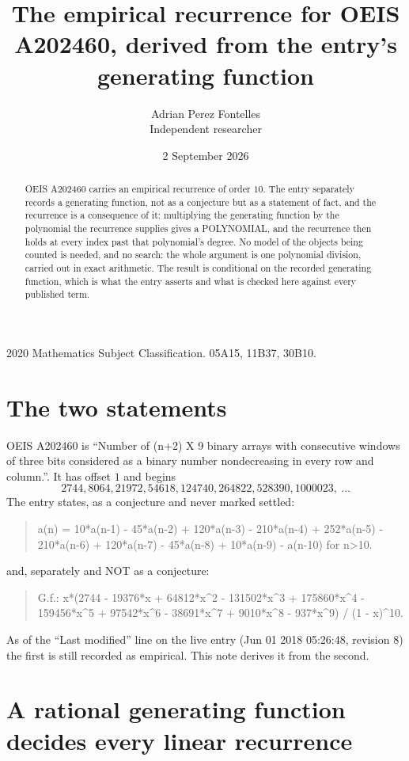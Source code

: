\documentclass[11pt,a4paper]{article}
\title{The empirical recurrence for OEIS A202460, derived from the entry's generating function}
\author{Adrian Perez Fontelles\\ \small Independent researcher}
\date{2 September 2026}
\theoremstyle{plain}
\theoremstyle{definition}
\begin{document}
\maketitle

\begin{abstract}
OEIS A202460 carries an empirical recurrence of order $10$. The entry separately records a
generating function, not as a conjecture but as a statement of fact, and the recurrence is a
consequence of it: multiplying the generating function by the polynomial the recurrence
supplies gives a POLYNOMIAL, and the recurrence then holds at every index past that
polynomial's degree. No model of the objects being counted is needed, and no search: the
whole argument is one polynomial division, carried out in exact arithmetic. The result is
conditional on the recorded generating function, which is what the entry asserts and what is
checked here against every published term.
\end{abstract}

\noindent\small 2020 Mathematics Subject Classification. 05A15, 11B37, 30B10.\normalsize

\section{The two statements}

OEIS A202460 is ``Number of (n+2) X 9 binary arrays with consecutive windows of three bits considered as a binary number nondecreasing in every row and column.''. It has offset $1$ and begins
\[
2744, 8064, 21972, 54618, 124740, 264822, 528390, 1000023,\ \dots
\]
The entry states, as a conjecture and never marked settled:
\begin{quote}
a(n) = 10*a(n-1) - 45*a(n-2) + 120*a(n-3) - 210*a(n-4) + 252*a(n-5) - 210*a(n-6) + 120*a(n-7) - 45*a(n-8) + 10*a(n-9) - a(n-10) for n>10.
\end{quote}
and, separately and NOT as a conjecture:
\begin{quote}
G.f.: x*(2744 - 19376*x + 64812*x\^{}2 - 131502*x\^{}3 + 175860*x\^{}4 - 159456*x\^{}5 + 97542*x\^{}6 - 38691*x\^{}7 + 9010*x\^{}8 - 937*x\^{}9) / (1 - x)\^{}10.
\end{quote}
As of the ``Last modified'' line on the live entry (Jun 01 2018 05:26:48, revision 8) the first is still
recorded as empirical. This note derives it from the second.

\section{A rational generating function decides every linear recurrence}
\end{document}
